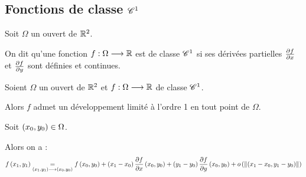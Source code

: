 \subsection{Fonctions de classe \(\mathscr{C}^{1}\)}


\begin{defi}
Soit \(\Omega\) un ouvert de \(\mathbb{R}^2\).

On dit qu'une fonction \(f:\Omega\longrightarrow\mathbb{R}\) est de classe \(\mathscr{C}^{1}\) si ses dérivées partielles \(\pdv{f}{x}\) et \(\pdv{f}{y}\) sont définies et continues.
\end{defi}


\begin{theo}
Soient \(\Omega\) un ouvert de \(\mathbb{R}^2\) et \(f:\Omega\longrightarrow\mathbb{R}\) de classe \(\mathscr{C}^{1}\).

Alors \(f\) admet un développement limité à l'ordre 1 en tout point de \(\Omega\).

Soit \(\left(x_0,y_0\right)\in\Omega\).

Alors on a : \[f\left(x_1,y_1\right)\underset{\left(x_1,y_1\right)\longrightarrow\left(x_0,y_0\right)}{=}f\left(x_0,y_0\right)+\left(x_1-x_0\right)\pdv{f}{x}\left(x_0,y_0\right)+\left(y_1-y_0\right)\pdv{f}{y}\left(x_0,y_0\right)+o\left(\left\|\left(x_1-x_0,y_1-y_0\right)\right\|\right)\]
\end{theo}

